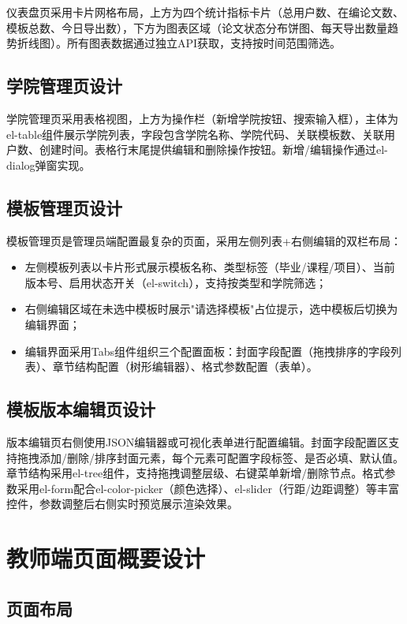 \documentclass{../../softeng}
\begin{document}
仪表盘页采用卡片网格布局，上方为四个统计指标卡片（总用户数、在编论文数、模板总数、今日导出数），下方为图表区域（论文状态分布饼图、每天导出数量趋势折线图）。所有图表数据通过独立API获取，支持按时间范围筛选。

\subsection{学院管理页设计}

学院管理页采用表格视图，上方为操作栏（新增学院按钮、搜索输入框），主体为el-table组件展示学院列表，字段包含学院名称、学院代码、关联模板数、关联用户数、创建时间。表格行末尾提供编辑和删除操作按钮。新增/编辑操作通过el-dialog弹窗实现。

\subsection{模板管理页设计}

模板管理页是管理员端配置最复杂的页面，采用左侧列表+右侧编辑的双栏布局：
\begin{itemize}
    \item 左侧模板列表以卡片形式展示模板名称、类型标签（毕业/课程/项目）、当前版本号、启用状态开关（el-switch），支持按类型和学院筛选；
    \item 右侧编辑区域在未选中模板时展示"请选择模板"占位提示，选中模板后切换为编辑界面；
    \item 编辑界面采用Tabs组件组织三个配置面板：封面字段配置（拖拽排序的字段列表）、章节结构配置（树形编辑器）、格式参数配置（表单）。
\end{itemize}

\subsection{模板版本编辑页设计}

版本编辑页右侧使用JSON编辑器或可视化表单进行配置编辑。封面字段配置区支持拖拽添加/删除/排序封面元素，每个元素可配置字段标签、是否必填、默认值。章节结构采用el-tree组件，支持拖拽调整层级、右键菜单新增/删除节点。格式参数采用el-form配合el-color-picker（颜色选择）、el-slider（行距/边距调整）等丰富控件，参数调整后右侧实时预览展示渲染效果。

\section{教师端页面概要设计}

\subsection{页面布局}
\end{document}
